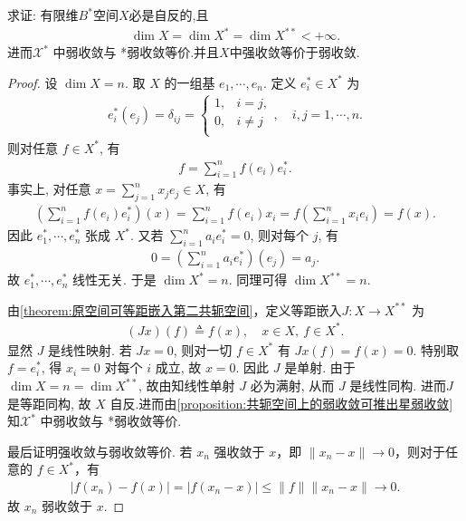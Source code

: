 \documentclass[../../main.tex]{subfiles}%
\begin{document}
\begin{proposition}
求证: 有限维$B^*$空间$X$必是自反的,且
\begin{align*}
\dim X=\dim X^{*}=\dim X^{**}<+\infty.
\end{align*}
进而$\mathscr{X}^*$ 中弱收敛与 *弱收敛等价.并且$X$中强收敛等价于弱收敛.
\end{proposition}
\begin{proof}
设 $\dim X=n$. 取 $X$ 的一组基 $e_1,\cdots,e_n$. 定义 $e_i^*\in X^*$ 为
\begin{align*}
e_i^*(e_j)=\delta_{ij}=\begin{cases}
1,&i=j,\\
0,&i\ne j\\
\end{cases},\quad i,j=1,\cdots,n.
\end{align*}
则对任意 $f\in X^*$, 有
\begin{align*}
f=\sum\limits_{i=1}^n f(e_i)e_i^*.
\end{align*}
事实上, 对任意 $x=\sum\limits_{j=1}^n x_j e_j\in X$, 有
\begin{align*}
\left(\sum\limits_{i=1}^n f(e_i)e_i^*\right)(x)
=\sum\limits_{i=1}^n f(e_i)x_i=f\left(\sum\limits_{i=1}^n x_i e_i\right)
=f(x).
\end{align*}
因此 $e_1^*,\cdots,e_n^*$ 张成 $X^*$. 又若 $\sum\limits_{i=1}^n a_i e_i^*=0$, 则对每个 $j$, 有
\begin{align*}
0=\left(\sum\limits_{i=1}^n a_i e_i^*\right)(e_j)=a_j.
\end{align*}
故 $e_1^*,\cdots,e_n^*$ 线性无关. 于是 $\dim X^*=n$. 同理可得 $\dim X^{**}=n$.

由\cref{theorem:原空间可等距嵌入第二共轭空间}，定义等距嵌入$J:X\to X^{**}$ 为
\begin{align*}
(Jx)(f)\triangleq f(x),\quad x\in X,\ f\in X^*.
\end{align*}
显然 $J$ 是线性映射. 若 $Jx=0$, 则对一切 $f\in X^*$ 有 $Jx(f)=f(x)=0$. 特别取 $f=e_i^*$, 得 $x_i=0$ 对每个 $i$ 成立, 故 $x=0$. 因此 $J$ 是单射. 由于 $\dim X=n=\dim X^{**}$, 故由知线性单射 $J$ 必为满射, 从而 $J$ 是线性同构. 进而$J$ 是等距同构, 故 $X$ 自反.进而由\cref{proposition:共轭空间上的弱收敛可推出星弱收敛}知$\mathscr{X}^*$ 中弱收敛与 *弱收敛等价.

最后证明强收敛与弱收敛等价.
若 \(x_n\) 强收敛于 \(x\)，即 \(\|x_n-x\|\to 0\)，则对于任意的 \(f\in X^*\)，有
\begin{align*}
|f(x_n)-f(x)| = |f(x_n-x)| \leqslant \|f\| \|x_n-x\| \to 0.
\end{align*}
故 \(x_n\) 弱收敛于 \(x\).


\end{proof}
\end{document}
